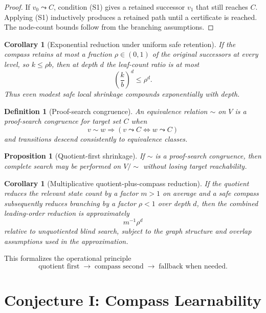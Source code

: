 \documentclass[11pt]{article}
\newtheorem{corollary}[theorem]{Corollary}
\newtheorem{proposition}[theorem]{Proposition}
\newtheorem{definition}[theorem]{Definition}
\begin{document}
\begin{proof}
If \(v_0\leadsto C\), condition (S1) gives a retained successor \(v_1\) that still reaches \(C\). Applying (S1) inductively produces a retained path until a certificate is reached. The node-count bounds follow from the branching assumptions.
\end{proof}

\begin{corollary}[Exponential reduction under uniform safe retention]
If the compass retains at most a fraction \(\rho\in(0,1)\) of the original successors at every level, so \(k\le \rho b\), then at depth \(d\) the leaf-count ratio is at most
\[
\left(\frac{k}{b}\right)^d\le \rho^d.
\]
Thus even modest safe local shrinkage compounds exponentially with depth.
\end{corollary}

\begin{definition}[Proof-search congruence]
An equivalence relation \(\sim\) on \(V\) is a proof-search congruence for target set \(C\) when
\[
v\sim w \Longrightarrow (v\leadsto C \iff w\leadsto C)
\]
and transitions descend consistently to equivalence classes.
\end{definition}

\begin{proposition}[Quotient-first shrinkage]
If \(\sim\) is a proof-search congruence, then complete search may be performed on \(V/{\sim}\) without losing target reachability.
\end{proposition}

\begin{corollary}[Multiplicative quotient-plus-compass reduction]
If the quotient reduces the relevant state count by a factor \(m>1\) on average and a safe compass subsequently reduces branching by a factor \(\rho<1\) over depth \(d\), then the combined leading-order reduction is approximately
\[
m^{-1}\rho^d
\]
relative to unquotiented blind search, subject to the graph structure and overlap assumptions used in the approximation.
\end{corollary}

This formalizes the operational principle
\[
\text{quotient first}\;\longrightarrow\;\text{compass second}\;\longrightarrow\;\text{fallback when needed}.
\]

\section{Conjecture I: Compass Learnability}
\end{document}
